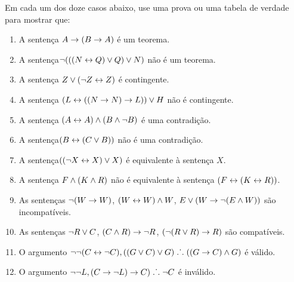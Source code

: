 \noindent\problempart Em cada um dos doze casos abaixo, use uma  prova ou uma tabela de verdade para mostrar que:
\begin{enumerate}%
\item A sentença $A \rightarrow (B \rightarrow A)$ é um teorema.
\item A sentença$\neg (((N \leftrightarrow Q) \vee Q) \vee N)$ não é um teorema.
\item A sentença $ Z \vee (\neg Z \leftrightarrow Z) $ é contingente.
\item A sentença $ (L \leftrightarrow ((N \rightarrow N) \rightarrow L)) \vee H $ não é contingente.
\item A sentença $ (A \leftrightarrow A) \wedge (B \wedge \neg B)$ é uma contradição.
\item A sentença$ (B \leftrightarrow (C \vee B)) $ não é uma contradição. 
\item A sentença$ ((\neg X \leftrightarrow X) \vee X) $  é equivalente à sentença $X$.
\item A sentença $F \wedge (K \wedge R) $ não  é equivalente à sentença $ (F \leftrightarrow (K \leftrightarrow R)) $.
\item As sentenças $ \neg (W \rightarrow W)$, $(W \leftrightarrow W) \wedge W$, $E \vee (W \rightarrow \neg (E \wedge W))$ são incompatíveis. 

\item As sentenças  $\neg R \vee C $, $(C \wedge R) \rightarrow \neg R$, $(\neg (R \vee R) \rightarrow R) $ são compatíveis.
\item O argumento $\neg \neg (C \leftrightarrow \neg C), ((G \vee C) \vee G) \mathrel{\ldotp\dot{}\,\ldotp} ((G \rightarrow C) \wedge G) $ é válido.
\item O argumento $ \neg \neg L,  (C \rightarrow \neg L) \rightarrow C) \mathrel{\ldotp\dot{}\,\ldotp} \neg C$  é  inválido.
\end{enumerate}

